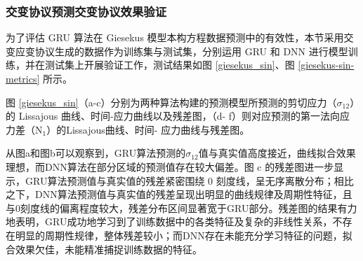 \subsubsection{交变协议预测交变协议效果验证}
为了评估 GRU 算法在 Giesekus 模型本构方程数据预测中的有效性，本节采用交变应变协议生成的数据作为训练集与测试集，分别运用 GRU 和 DNN 进行模型训练，并在测试集上开展验证工作，测试结果如图 \ref{giesekus_sin}、图 \ref{giesekus-sin-metrics} 所示。

图 \ref{giesekus_sin}（a-c）分别为两种算法构建的预测模型所预测的剪切应力（$\sigma_{12}$）的 Lissajous 曲线、时间-应力曲线以及残差图，（d- f）则对应预测的第一法向应力差（N$_{1}$）的Lissajous曲线、时间- 应力曲线与残差图。

从图a和图b可以观察到，GRU算法预测的$\sigma_{12}$值与真实值高度接近，曲线拟合效果理想，而DNN算法在部分区域的预测值存在较大偏差。图 c 的残差图进一步显示，GRU算法预测值与真实值的残差紧密围绕 0 刻度线，呈无序离散分布；相比之下，DNN算法预测值与真实值的残差呈现出明显的曲线规律及周期性特征，且与0刻度线的偏离程度较大，残差分布区间显著宽于GRU部分。残差图的结果有力地表明，GRU成功地学习到了训练数据中的各类特征及复杂的非线性关系，不存在明显的周期性规律，整体残差较小；而DNN存在未能充分学习特征的问题，拟合效果欠佳，未能精准捕捉训练数据的特征。

